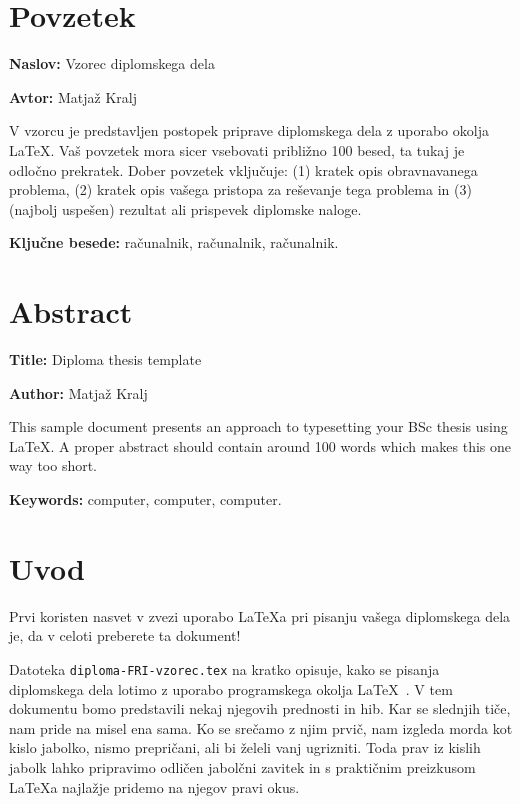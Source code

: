\documentclass[a4paper,12pt,openright]{book}
\newcommand{\ttitle}{Vzorec diplomskega dela}
\newcommand{\ttitleEn}{Diploma thesis template}
\newcommand{\tauthor}{Matjaž Kralj}
\newcommand{\tkeywords}{računalnik, računalnik, računalnik}
\newcommand{\tkeywordsEn}{computer, computer, computer}
\newcommand{\clearemptydoublepage}{\newpage{\pagestyle{empty}\cleardoublepage}}
\begin{document}
\clearemptydoublepage

\chapter*{Povzetek}

\noindent\textbf{Naslov:} \ttitle
\bigskip

\noindent\textbf{Avtor:} \tauthor
\bigskip

\noindent V vzorcu je predstavljen postopek priprave diplomskega dela z uporabo okolja \LaTeX. Vaš povzetek mora sicer vsebovati približno 100 besed, ta tukaj je odločno prekratek.
Dober povzetek vključuje: (1) kratek opis obravnavanega problema, (2) kratek opis vašega pristopa za reševanje tega problema in (3) (najbolj uspešen) rezultat ali prispevek diplomske naloge.

\bigskip

\noindent\textbf{Ključne besede:} \tkeywords.
\clearemptydoublepage

\chapter*{Abstract}

\noindent\textbf{Title:} \ttitleEn
\bigskip

\noindent\textbf{Author:} \tauthor
\bigskip

\noindent This sample document presents an approach to typesetting your BSc thesis using \LaTeX. 
A proper abstract should contain around 100 words which makes this one way too short.
\bigskip

\noindent\textbf{Keywords:} \tkeywordsEn.
\clearemptydoublepage

\mainmatter
\setcounter{page}{1}
\pagestyle{fancy}

\chapter{Uvod}
Prvi koristen nasvet v zvezi uporabo \LaTeX{a} pri pisanju vašega diplomskega dela je, da v celoti preberete ta dokument!

Datoteka {\tt diploma-FRI-vzorec.tex} na kratko opisuje, kako se pisanja diplomskega dela lotimo z uporabo programskega okolja \LaTeX~\cite{lamport,nenajkrajsi}. 
V tem dokumentu bomo predstavili nekaj njegovih prednosti in hib. 
Kar se slednjih tiče, nam pride na misel ena sama. 
Ko se srečamo z njim prvič, nam izgleda morda kot kislo jabolko, nismo prepričani, ali bi želeli vanj ugrizniti. 
Toda prav iz kislih jabolk lahko pripravimo odličen jabolčni zavitek in s praktičnim preizkusom \LaTeX a najlažje pridemo na njegov pravi okus.
\end{document}
